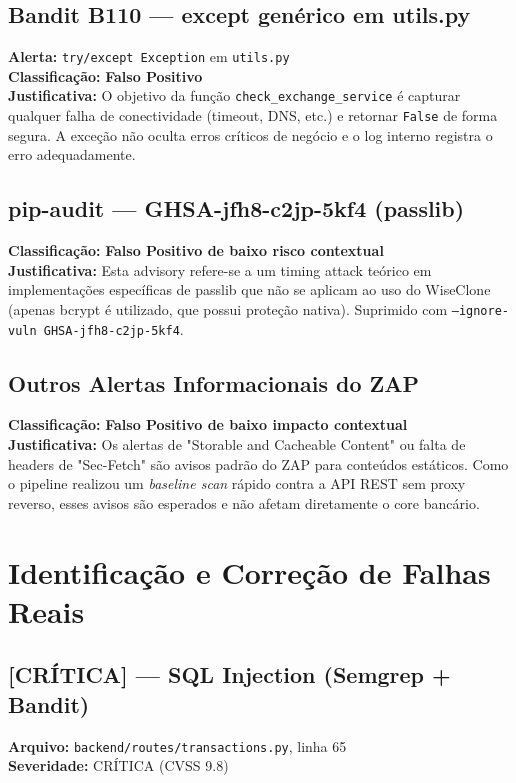 \documentclass[12pt,a4paper]{article}
\begin{document}
\subsection{Bandit B110 — except genérico em utils.py}
\textbf{Alerta:} \texttt{try/except Exception} em \texttt{utils.py} \\
\textbf{Classificação:} \textbf{Falso Positivo} \\
\textbf{Justificativa:} O objetivo da função \texttt{check\_exchange\_service} é capturar qualquer falha de conectividade (timeout, DNS, etc.) e retornar \texttt{False} de forma segura. A exceção não oculta erros críticos de negócio e o log interno registra o erro adequadamente.

\subsection{pip-audit — GHSA-jfh8-c2jp-5kf4 (passlib)}
\textbf{Classificação:} \textbf{Falso Positivo de baixo risco contextual} \\
\textbf{Justificativa:} Esta advisory refere-se a um timing attack teórico em implementações específicas de passlib que não se aplicam ao uso do WiseClone (apenas bcrypt é utilizado, que possui proteção nativa). Suprimido com \texttt{--ignore-vuln GHSA-jfh8-c2jp-5kf4}.

\subsection{Outros Alertas Informacionais do ZAP}
\textbf{Classificação:} \textbf{Falso Positivo de baixo impacto contextual} \\
\textbf{Justificativa:} Os alertas de "Storable and Cacheable Content" ou falta de headers de "Sec-Fetch" são avisos padrão do ZAP para conteúdos estáticos. Como o pipeline realizou um \textit{baseline scan} rápido contra a API REST sem proxy reverso, esses avisos são esperados e não afetam diretamente o core bancário.

\section{Identificação e Correção de Falhas Reais}

\subsection{[CRÍTICA] — SQL Injection (Semgrep + Bandit)}
\textbf{Arquivo:} \texttt{backend/routes/transactions.py}, linha 65 \\
\textbf{Severidade:} CRÍTICA (CVSS 9.8)
\end{document}

